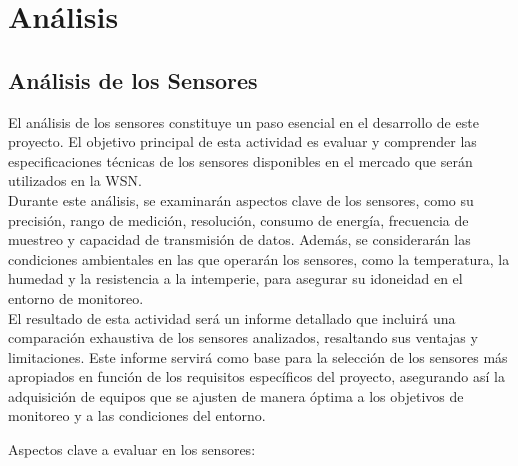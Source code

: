 \chapter{Análisis}

\section{Análisis de los Sensores}

El análisis de los sensores constituye un paso esencial en el desarrollo de este proyecto. El objetivo principal de esta actividad es evaluar y comprender las especificaciones técnicas de los sensores disponibles en el mercado que serán utilizados en la WSN.\\
Durante este análisis, se examinarán aspectos clave de los sensores, como su precisión, rango de medición, resolución, consumo de energía, frecuencia de muestreo y capacidad de transmisión de datos. Además, se considerarán las condiciones ambientales en las que operarán los sensores, como la temperatura, la humedad y la resistencia a la intemperie, para asegurar su idoneidad en el entorno de monitoreo.\\
El resultado de esta actividad será un informe detallado que incluirá una comparación exhaustiva de los sensores analizados, resaltando sus ventajas y limitaciones. Este informe servirá como base para la selección de los sensores más apropiados en función de los requisitos específicos del proyecto, asegurando así la adquisición de equipos que se ajusten de manera óptima a los objetivos de monitoreo y a las condiciones del entorno.

\noindent Aspectos clave a evaluar en los sensores:

